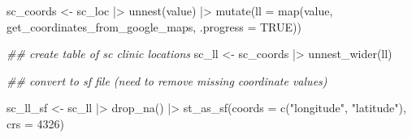 \documentclass[
  letterpaper,
  DIV=11,
  numbers=noendperiod]{scrreprt}
\newenvironment{Shaded}{\begin{snugshade}}{\end{snugshade}}
\newcommand{\AttributeTok}[1]{\textcolor[rgb]{0.40,0.45,0.13}{#1}}
\newcommand{\ConstantTok}[1]{\textcolor[rgb]{0.56,0.35,0.01}{#1}}
\newcommand{\DecValTok}[1]{\textcolor[rgb]{0.68,0.00,0.00}{#1}}
\newcommand{\DocumentationTok}[1]{\textcolor[rgb]{0.37,0.37,0.37}{\textit{#1}}}
\newcommand{\FunctionTok}[1]{\textcolor[rgb]{0.28,0.35,0.67}{#1}}
\newcommand{\NormalTok}[1]{\textcolor[rgb]{0.00,0.23,0.31}{#1}}
\newcommand{\OtherTok}[1]{\textcolor[rgb]{0.00,0.23,0.31}{#1}}
\newcommand{\SpecialCharTok}[1]{\textcolor[rgb]{0.37,0.37,0.37}{#1}}
\newcommand{\StringTok}[1]{\textcolor[rgb]{0.13,0.47,0.30}{#1}}
\begin{document}
\begin{Shaded}
\begin{Highlighting}[]
\NormalTok{sc\_coords }\OtherTok{\textless{}{-}}\NormalTok{ sc\_loc }\SpecialCharTok{|\textgreater{}}
  \FunctionTok{unnest}\NormalTok{(value) }\SpecialCharTok{|\textgreater{}}
  \FunctionTok{mutate}\NormalTok{(}\AttributeTok{ll =} \FunctionTok{map}\NormalTok{(value, get\_coordinates\_from\_google\_maps, }\AttributeTok{.progress =} \ConstantTok{TRUE}\NormalTok{))}

\DocumentationTok{\#\# create table of sc clinic locations }
\NormalTok{sc\_ll }\OtherTok{\textless{}{-}}\NormalTok{ sc\_coords }\SpecialCharTok{|\textgreater{}}
    \FunctionTok{unnest\_wider}\NormalTok{(ll)}

\DocumentationTok{\#\# convert to sf file (need to remove missing coordinate values)}

\NormalTok{sc\_ll\_sf }\OtherTok{\textless{}{-}}\NormalTok{ sc\_ll }\SpecialCharTok{|\textgreater{}}
    \FunctionTok{drop\_na}\NormalTok{() }\SpecialCharTok{|\textgreater{}}
    \FunctionTok{st\_as\_sf}\NormalTok{(}\AttributeTok{coords =} \FunctionTok{c}\NormalTok{(}\StringTok{"longitude"}\NormalTok{, }\StringTok{"latitude"}\NormalTok{), }\AttributeTok{crs =} \DecValTok{4326}\NormalTok{)}
\end{Highlighting}
\end{Shaded}
\end{document}
